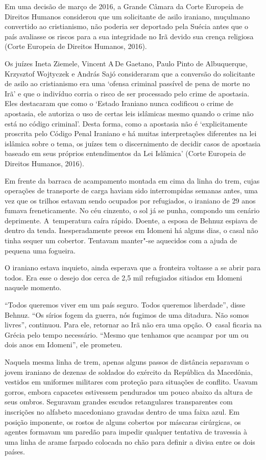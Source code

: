 {Em uma decisão de março de 2016, a Grande Câmara da Corte Europeia de
Direitos Humanos considerou que um solicitante de asilo iraniano,
muçulmano convertido ao cristianismo, não poderia ser deportado pela
Suécia antes que o país avaliasse os riscos para a sua integridade no
Irã devido sua crença religiosa (Corte Europeia de Direitos Humanos,
2016).

Os juízes Ineta Ziemele, Vincent A\,De Gaetano, Paulo Pinto de
Albuquerque, Krzysztof Wojtyczek e András Sajó consideraram que a
conversão do solicitante de asilo ao cristianismo era uma `ofensa
criminal passível de pena de morte no Irã' e que o indivíduo corria o
risco de ser processado pelo crime de apostasia. Eles destacaram que como
o `Estado Iraniano nunca codificou o crime de apostasia, ele autoriza o
uso de certas leis islâmicas mesmo quando o crime não está no código
criminal'. Desta forma, como a apostasia não é `explicitamente proscrita
pelo Código Penal Iraniano e há muitas interpretações diferentes na lei
islâmica sobre o tema, os juízes tem o discernimento de decidir casos de
apostasia baseado em seus próprios entendimentos da Lei Islâmica' (Corte
Europeia de Direitos Humanos, 2016).}


Em frente da barraca de acampamento montada em cima da linha do trem,
cujas operações de transporte de carga haviam sido interrompidas semanas
antes, uma vez que os trilhos estavam sendo ocupados por refugiados, o iraniano
de 29 anos fumava freneticamente. No céu cinzento, o sol já se punha,
compondo um cenário deprimente. A~temperatura caíra rápido. Doente, a
esposa de Behnuz espiava de dentro da tenda. Inesperadamente presos em
Idomeni há alguns dias, o casal não tinha sequer um cobertor. Tentavam
manter"-se aquecidos com a ajuda de pequena uma fogueira.

O iraniano estava inquieto, ainda esperava que a fronteira voltasse a se
abrir para todos. Era esse o desejo dos cerca de 2,5 mil refugiados
sitiados em Idomeni naquele momento.

``Todos queremos viver em um país seguro. Todos queremos liberdade'',
disse Behnuz. ``Os sírios fogem da guerra, nós fugimos de uma ditadura.
Não somos livres'', continuou. Para ele, retornar ao Irã não era uma
opção. O~casal ficaria na Grécia pelo tempo necessário.
``Mesmo que tenhamos que acampar por um ou dois anos em Idomeni'', ele prometeu.

Naquela mesma linha de trem, apenas alguns passos de distância separavam
o jovem iraniano de dezenas de soldados do exército da República da
Macedônia, vestidos em uniformes militares com proteção para situações
de conflito. Usavam gorros, embora capacetes estivessem pendurados um
pouco abaixo da altura de seus ombros. Seguravam grandes escudos
retangulares transparentes com inscrições no alfabeto macedoniano
gravadas dentro de uma faixa azul. Em posição imponente, os rostos de
alguns cobertos por máscaras cirúrgicas, os agentes formavam um paredão
para impedir qualquer tentativa de travessia à uma linha de arame
farpado colocada no chão para definir a divisa entre os dois países.

